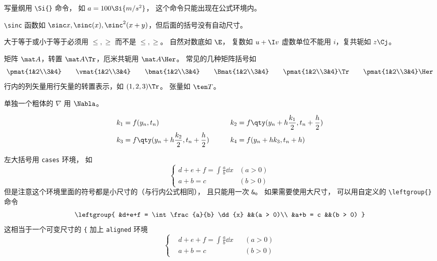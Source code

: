 写量纲用 \lstinline|\Si{}| 命令， 如 $a = 100\Si{m/s^2}$， 这个命令只能出现在公式环境内。

 \lstinline|\sinc| 函数如 $\sinc x, \sinc(x), \sinc^2(x+y)$，但后面的括号没有自动尺寸。
 
 大于等于或小于等于必须用 $\leqslant, \geqslant$ 而不是 $\le, \ge$。 自然对数底如 $\E$， 复数如 $u+\I v$ 虚数单位不能用 $i$，复共轭如 $z\Cj$。
 
 矩阵 $\mat A$，转置 $\mat A \Tr$，厄米共轭用 $\mat A \Her$。 常见的几种矩阵括号如
\begin{equation}
\pmat{1&2\\3&4} \qquad
\vmat{1&2\\3&4} \qquad 
\bmat{1&2\\3&4} \qquad
\Bmat{1&2\\3&4} \qquad
\pmat{1&2\\3&4}\Tr \qquad
\pmat{1&2\\3&4}\Her
\end{equation}
行内的列矢量用行矢量的转置表示，如 $(1,2,3)\Tr$。 张量如 $\ten T$。

单独一个粗体的 $\nabla$ 用 $\Nabla$。

\begin{equation}
\begin{aligned}
k_1 &= f(y_n, t_n) 
& k_2 &= f \qty(y_n + h\frac{k_1}{2}, t_n + \frac h2 )\\
k_3 &= f \qty( y_n + h\frac{k_2}{2}, t_n + \frac h2 ) \qquad
& k_4 &= f(y_n + hk_3, t_n + h)
\end{aligned}
\end{equation}

左大括号用 \lstinline|cases| 环境， 如
\begin{equation}
\begin{cases}
d+e+f = \int \frac{a}{b} \dd{x} &(a > 0)\\
a+b = c &(b > 0)
\end{cases}
\end{equation}
但是注意这个环境里面的符号都是小尺寸的（与行内公式相同）， 且只能用一次 \lstinline|&|。 如果需要使用大尺寸， 可以用自定义的 \lstinline|\leftgroup{}| 命令
\begin{equation}
\leftgroup{
&d+e+f = \int \frac{a}{b} \dd{x} &&(a > 0)\\
&a+b = c &&(b > 0)
}
\end{equation}
这相当于一个可变尺寸的 \lstinline|{| 加上 \lstinline|aligned| 环境
\begin{equation}
\left\{
\begin{aligned}
&d+e+f = \int \frac{a}{b} \dd{x} &&(a > 0)\\
&a+b = c &&(b > 0)
\end{aligned}
\right.
\end{equation}

